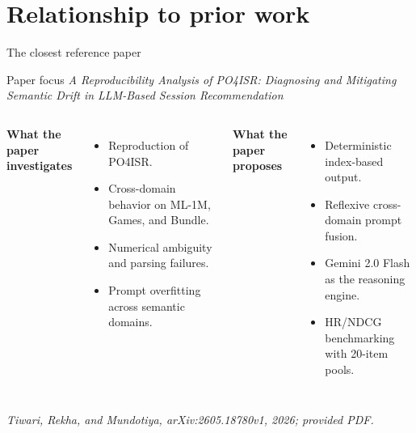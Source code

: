 \documentclass[aspectratio=169,12pt]{beamer}
\newcommand{\source}[1]{\vspace{0.35em}\par{\tiny\color{Muted}\textit{#1}}}
\begin{document}
\section{Relationship to prior work}

\begin{frame}{The closest reference paper}
\begin{block}{Paper focus}
\emph{A Reproducibility Analysis of PO4ISR: Diagnosing and Mitigating Semantic
Drift in LLM-Based Session Recommendation}
\end{block}

\begin{columns}[T]
\textbf{What the paper investigates}
\begin{itemize}
  \item Reproduction of PO4ISR.
  \item Cross-domain behavior on ML-1M, Games, and Bundle.
  \item Numerical ambiguity and parsing failures.
  \item Prompt overfitting across semantic domains.
\end{itemize}

\textbf{What the paper proposes}
\begin{itemize}
  \item Deterministic index-based output.
  \item Reflexive cross-domain prompt fusion.
  \item Gemini 2.0 Flash as the reasoning engine.
  \item HR/NDCG benchmarking with 20-item pools.
\end{itemize}
\end{columns}

\source{Tiwari, Rekha, and Mundotiya, arXiv:2605.18780v1, 2026; provided PDF.}
\end{frame}
\end{document}
